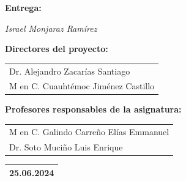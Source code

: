 \documentclass[11pt,a4paper]{article}
\begin{document}
	
	\begin{center}
		\begin{Large}
			\textbf{Entrega:}\\[0.2cm] 
		\end{Large}
		
			{\Large\textit{	Israel Monjaraz Ramírez}}\\[0.2cm] 
		
		\begin{Large}
			\textbf{Directores del proyecto:}\\[0.2cm] 
		\end{Large}
		
		
		\begin{tabular}{l}
			Dr.	Alejandro Zacarías Santiago\\
			M en C. Cuauhtémoc Jiménez Castillo\\
		\end{tabular}

		
	\end{center}
	\vspace{0.2cm}
	\begin{center}
		\begin{Large}
			\textbf{Profesores responsables de la asignatura:}\\[0.2cm] 
		\end{Large}
		
		
		\begin{tabular}{l}
			M en C. Galindo Carreño Elías Emmanuel\\
			Dr. Soto Muciño Luis Enrique
		\end{tabular}
		
	\end{center}
	\vspace{0.8cm}
	\begin{flushright}
		\begin{tabular}{|c|}
			\hline
			25.06.2024\\
			\hline
		\end{tabular}
	\end{flushright}
	
	
	
\end{document}
